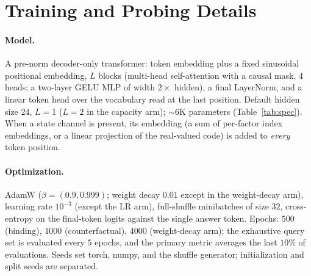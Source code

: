 \documentclass[10pt]{article} %
\begin{document}
\begin{table}[h]
\centering\small
{}
\caption{Three-object world, converged held-out balanced accuracy by route and dose ($n{=}10$,
chance $0.333$; subscripts are $95\%$ bootstrap CIs). Pooled vs.\ oracle: one-hot $+0.066$
($p{=}0.037$); strong-entangled $-0.348$ ($p{=}0.002$); weak-perceptual $-0.001$ ($p{=}0.77$,
non-replicating).}
\label{tab:bind3}
\end{table}

\section{Training and Probing Details}
\label{app:training}
\paragraph{Model.} A pre-norm decoder-only transformer: token embedding plus a fixed sinusoidal
positional embedding, $L$ blocks (multi-head self-attention with a causal mask, $4$ heads; a
two-layer GELU MLP of width $2\times$ hidden), a final LayerNorm, and a linear token head over the
vocabulary read at the last position. Default hidden size $24$, $L{=}1$ ($L{=}2$ in the capacity
arm); ${\sim}6$K parameters (Table~\ref{tab:spec}). When a state channel is present, its embedding
(a sum of per-factor index embeddings, or a linear projection of the real-valued code) is added to
\emph{every} token position.
\paragraph{Optimization.} AdamW ($\beta=(0.9, 0.999)$; weight decay $0.01$ except in the
weight-decay arm), learning rate $10^{-3}$ (except the LR arm), full-shuffle minibatches of size
$32$, cross-entropy on the final-token logits against the single answer token. Epochs: $500$
(binding), $1000$ (counterfactual), $4000$ (weight-decay arm); the exhaustive query set is evaluated
every $5$ epochs, and the primary metric averages the last $10\%$ of evaluations. Seeds set torch,
numpy, and the shuffle generator; initialization and split seeds are separated.
\end{document}
